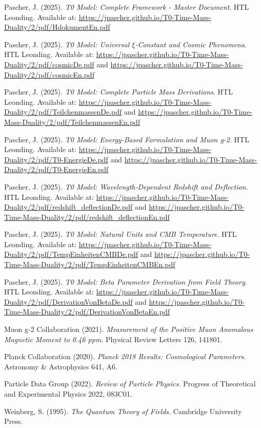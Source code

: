 \documentclass[12pt,a4paper]{report}
\begin{document}
	\begin{thebibliography}{99}
		Pascher, J. (2025). \textit{T0 Model: Complete Framework - Master Document}. HTL Leonding. Available at: \url{https://jpascher.github.io/T0-Time-Mass-Duality/2/pdf/HdokumentEn.pdf}
		
		Pascher, J. (2025). \textit{T0 Model: Universal $\xi$-Constant and Cosmic Phenomena}. HTL Leonding. Available at: \url{https://jpascher.github.io/T0-Time-Mass-Duality/2/pdf/cosmicDe.pdf} and \url{https://jpascher.github.io/T0-Time-Mass-Duality/2/pdf/cosmicEn.pdf}
		
		Pascher, J. (2025). \textit{T0 Model: Complete Particle Mass Derivations}. HTL Leonding. Available at: \url{https://jpascher.github.io/T0-Time-Mass-Duality/2/pdf/TeilchenmassenDe.pdf} and \url{https://jpascher.github.io/T0-Time-Mass-Duality/2/pdf/TeilchenmassenEn.pdf}
		
		Pascher, J. (2025). \textit{T0 Model: Energy-Based Formulation and Muon g-2}. HTL Leonding. Available at: \url{https://jpascher.github.io/T0-Time-Mass-Duality/2/pdf/T0-EnergieDe.pdf} and \url{https://jpascher.github.io/T0-Time-Mass-Duality/2/pdf/T0-EnergieEn.pdf}
		
		Pascher, J. (2025). \textit{T0 Model: Wavelength-Dependent Redshift and Deflection}. HTL Leonding. Available at: \url{https://jpascher.github.io/T0-Time-Mass-Duality/2/pdf/redshift_deflectionDe.pdf} and \url{https://jpascher.github.io/T0-Time-Mass-Duality/2/pdf/redshift_deflectionEn.pdf}
		
		Pascher, J. (2025). \textit{T0 Model: Natural Units and CMB Temperature}. HTL Leonding. Available at: \url{https://jpascher.github.io/T0-Time-Mass-Duality/2/pdf/TempEinheitenCMBDe.pdf} and \url{https://jpascher.github.io/T0-Time-Mass-Duality/2/pdf/TempEinheitenCMBEn.pdf}
		
		Pascher, J. (2025). \textit{T0 Model: Beta Parameter Derivation from Field Theory}. HTL Leonding. Available at: \url{https://jpascher.github.io/T0-Time-Mass-Duality/2/pdf/DerivationVonBetaDe.pdf} and \url{https://jpascher.github.io/T0-Time-Mass-Duality/2/pdf/DerivationVonBetaEn.pdf}
		
		Muon g-2 Collaboration (2021). \textit{Measurement of the Positive Muon Anomalous Magnetic Moment to 0.46 ppm}. Physical Review Letters 126, 141801.
		
		Planck Collaboration (2020). \textit{Planck 2018 Results: Cosmological Parameters}. Astronomy \& Astrophysics 641, A6.
		
		Particle Data Group (2022). \textit{Review of Particle Physics}. Progress of Theoretical and Experimental Physics 2022, 083C01.
		
		Weinberg, S. (1995). \textit{The Quantum Theory of Fields}. Cambridge University Press.
	\end{thebibliography}
	
\end{document}
